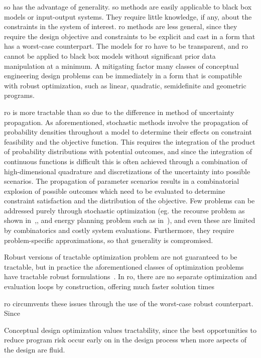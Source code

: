 \gls{so} has the advantage of generality.
\gls{so} methods are easily applicable to black box models or input-output systems.
They require little knowledge, if any, about the constraints in the system of interest.
\gls{ro} methods are less general, since they require
the design objective and constraints to be explicit and cast in a form that has a worst-case
counterpart. The models for \gls{ro} have to be transparent,
and \gls{ro} cannot be applied to black box models without significant prior data
manipulation at a minimum. A mitigating factor
many classes of conceptual engineering design problems can be immediately in a form that
is compatible with robust optimization, such as linear, quadratic, semidefinite
and geometric programs.

\gls{ro} is more tractable than \gls{so} due to the difference in method of uncertainty propagation.
As aforementioned, stochastic methods involve the propagation of probability densities throughout a model
to determine their effects on constraint feasibility and the objective function.
This requires the integration of the product of probability distributions with potential outcomes,
and since the integration of continuous functions is difficult this is often achieved through
a combination of high-dimensional quadrature and discretizations of the uncertainty into
possible scenarios. The propagation of parameter
scenarios results in a combinatorial explosion of possible outcomes which need to be evaluated to determine constraint
satisfaction and the distribution of the objective. Few problems can be addressed purely
through stochastic optimization (eg. the recourse problem as
shown in~\cite{Kall1982},\cite{Higle1991}, and energy planning problem such as in~\cite{Pereira1991}), and
even these are limited by combinatorics and costly system evaluations. Furthermore, they require
problem-specific approximations, so that generality is compromised.

Robust versions of tractable optimization problem are not
guaranteed to be tractable, but in practice the aforementioned classes of optimization problems
have tractable robust formulations~\cite{Bertsimas2011}. In \gls{ro}, there are no separate optimization and evaluation
loops by construction, offering much faster solution times


\gls{ro} circumvents these issues through the use of the worst-case robust counterpart. Since

Conceptual design optimization values tractability, since the best opportunities
to reduce program risk occur early on in the design process when more aspects
of the design are fluid.




